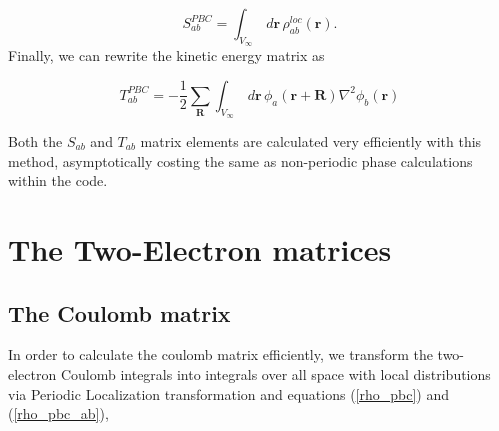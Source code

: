 \documentclass[prb,aps,nobibnotes,twocolumn,doublespace,twocolumngrid,superbib]{revtex4}
\begin{document}
\begin{equation}
\label{Sab_pbc_3}
S_{ab}^{PBC}=\int _{V_{\infty }}\, d{\mathbf{r}}\, \rho ^{loc}_{ab}({\mathbf{r}}).
\end{equation}
Finally, we can rewrite the kinetic energy matrix as

\begin{equation}
\label{Tab_pbc}
T^{PBC}_{ab}=-\frac{1}{2}\sum _{\mathbf{R}}\int _{V_{\infty }}\, d{\mathbf{r}}\, 
\phi _{a}({\mathbf{r}+\mathbf{R}})\nabla ^{2}\phi _{b}({\mathbf{r}})
\end{equation}

Both the $S_{ab}$ and $T_{ab}$ matrix elements are calculated very efficiently
with this method, asymptotically costing the same as non-periodic phase calculations
within the code.

\section{The Two-Electron matrices}


\subsection{The Coulomb matrix}

In order to calculate the coulomb matrix efficiently, we transform
the two-electron Coulomb integrals into integrals over all space with
local distributions via Periodic Localization transformation  and equations (\ref{rho_pbc})
and (\ref{rho_pbc_ab}), 
\end{document}
